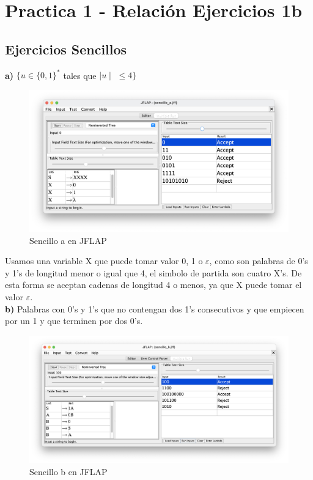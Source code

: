 \newpage %

\tableofcontents %
\listoffigures %

\newpage

\section{Practica 1 - Relación Ejercicios 1b}

\subsection{Ejercicios Sencillos}

\textbf{a)}  $\{ u \in \{0,1\}^{\ast} $ tales que $\mid u \mid$ $\leq 4 \}$

\begin{figure}[H] 
	\centering
	\includegraphics[scale=0.35]{../practica_1/images/sencillo_a.png} 
	\caption{Sencillo a en JFLAP} 
    \label{fig:sencillo_a}
\end{figure}

Usamos una variable X que puede tomar valor 0, 1 o $\varepsilon$, como son palabras de 0's y 1's de longitud menor o igual que 4, 
el simbolo de partida son cuatro X's. De esta forma se aceptan cadenas de longitud 4 o menos, ya que X puede tomar el valor $\varepsilon$. \\

\textbf{b)}  Palabras con 0's y 1's que no contengan dos 1's consecutivos y que empiecen por un 1 y que terminen por dos 0's.

\begin{figure}[H] 
	\centering
	\includegraphics[scale=0.35]{../practica_1/images/sencillo_b.png} 
	\caption{Sencillo b en JFLAP} 
    \label{fig:sencillo_b}
\end{figure}

